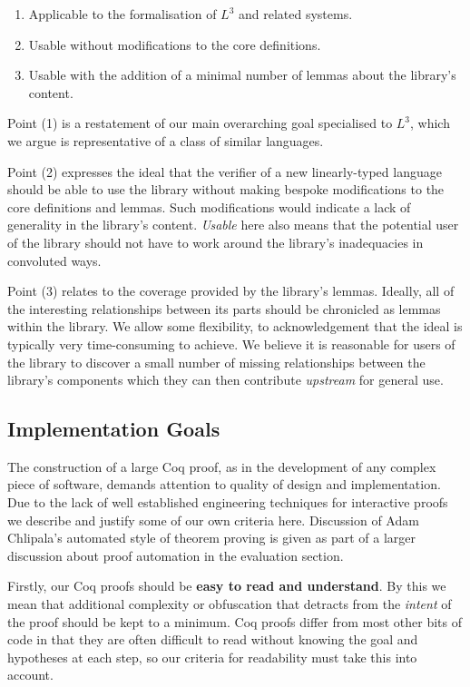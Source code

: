 \documentclass[]{unswthesis}
\let\i\textit
\let\b\textbf
\begin{document}
\begin{enumerate}
\item Applicable to the formalisation of $L^3$ and related systems.
\item Usable without modifications to the core definitions.
\item Usable with the addition of a minimal number of lemmas about the library's content.
\end{enumerate}

Point (1) is a restatement of our main overarching goal specialised to $L^3$, which we argue is representative of a class of similar languages.

Point (2) expresses the ideal that the verifier of a new linearly-typed language should be able to use the library without making bespoke modifications to the core definitions and lemmas. Such modifications would indicate a lack of generality in the library's content. \i{Usable} here also means that the potential user of the library should not have to work around the library's inadequacies in convoluted ways.

Point (3) relates to the coverage provided by the library's lemmas. Ideally, all of the interesting relationships between its parts should be chronicled as lemmas within the library. We allow some flexibility, to acknowledgement that the ideal is typically very time-consuming to achieve. We believe it is reasonable for users of the library to discover a small number of missing relationships between the library's components which they can then contribute \i{upstream} for general use.

\subsection{Implementation Goals}
\label{sec:impl-goals}

The construction of a large Coq proof, as in the development of any complex piece of software, demands attention to quality of design and implementation. Due to the lack of well established engineering techniques for interactive proofs we describe and justify some of our own criteria here. Discussion of Adam Chlipala's automated style of theorem proving is given as part of a larger discussion about proof automation in the evaluation section.

Firstly, our Coq proofs should be \b{easy to read and understand}. By this we mean that additional complexity or obfuscation that detracts from the \i{intent} of the proof should be kept to a minimum. Coq proofs differ from most other bits of code in that they are often difficult to read without knowing the goal and hypotheses at each step, so our criteria for readability must take this into account.
\end{document}
